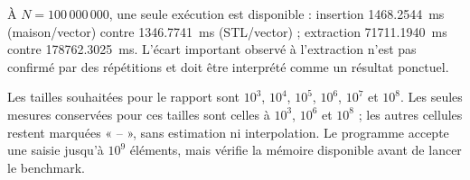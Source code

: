 \documentclass[12pt,a4paper]{article}
\begin{document}
À $N=100\,000\,000$, une seule exécution est disponible : insertion
\SI{1468.2544}{ms} (maison/vector) contre \SI{1346.7741}{ms} (STL/vector) ;
extraction \SI{71711.1940}{ms} contre \SI{178762.3025}{ms}. L'écart important
observé à l'extraction n'est pas confirmé par des répétitions et doit être
interprété comme un résultat ponctuel.

Les tailles souhaitées pour le rapport sont $10^3$, $10^4$, $10^5$, $10^6$,
$10^7$ et $10^8$. Les seules mesures conservées pour ces tailles sont celles
à $10^3$, $10^6$ et $10^8$ ; les autres cellules restent marquées « -- »,
sans estimation ni interpolation. Le
programme accepte une saisie jusqu'à $10^9$ éléments, mais vérifie la mémoire
disponible avant de lancer le benchmark.
\end{document}

